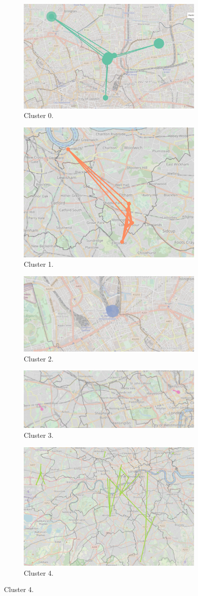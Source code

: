 \documentclass{article}
\theoremstyle{remark}
\begin{document}
\begin{figure}[!h]

\centering
\begin{subfigure}{0.6\textheight}
\centering
\includegraphics[width=0.4\linewidth]{figures/weekend_locals_c0.png}
\caption{Cluster 0.}
\label{fig:weekend_locals_c0}
\end{subfigure}
\begin{subfigure}{0.6\textheight}
\centering
\includegraphics[width=0.4\linewidth]{figures/weekend_locals_c1.png}
\caption{Cluster 1.}
\label{fig:weekend_locals_c1}
\end{subfigure}
\begin{subfigure}{0.6\textheight}
\centering
\includegraphics[width=0.4\linewidth]{figures/weekend_locals_c2.png}
\caption{Cluster 2.}
\label{fig:weekend_locals_c2}
\end{subfigure}
\begin{subfigure}{0.6\textheight}
\centering
\includegraphics[width=0.4\linewidth]{figures/weekend_locals_c3.png}
\caption{Cluster 3.}
\label{fig:weekend_locals_c3}
\end{subfigure}
\begin{subfigure}{0.6\textheight}
\centering
\includegraphics[width=0.4\linewidth]{figures/weekend_locals_c4.png}
\caption{Cluster 4.}
\label{fig:weekend_locals_c4}
\end{subfigure}


\end{figure}
\end{document}
